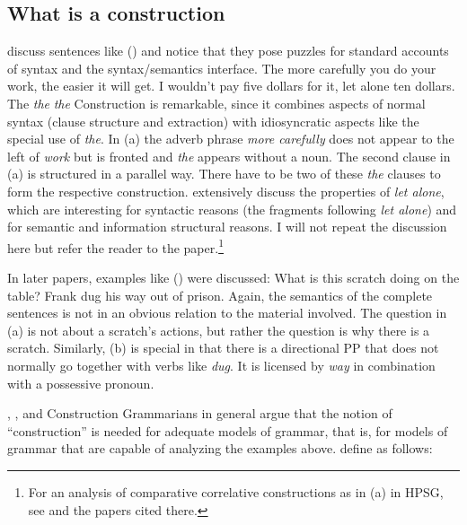 \documentclass[output=paper,biblatex,babelshorthands,newtxmath,draftmode,colorlinks,citecolor=brown]{langscibook}
\begin{document}
\subsection{What is a construction}
\label{sec-def-construction}

\citet*{FKoC88a} discuss sentences like () and notice that they pose puzzles for standard
accounts of syntax and the syntax/semantics interface.
\eal
\ex The more carefully you do your work, the easier it will get.
\ex I wouldn't pay five dollars for it, let alone ten dollars.
\zl
The \emph{the}  \emph{the}  Construction is remarkable, since it combines aspects of normal syntax
(clause structure and extraction) with idiosyncratic aspects like the special use of
\emph{the}. In (a) the adverb phrase \emph{more carefully} does not appear to the left of
\emph{work} but is fronted and \emph{the} appears without a noun. The second clause in (a) is structured
in a parallel way. There have to be two of these \emph{the} clauses to form the respective
construction. \citet*{FKoC88a} extensively discuss the properties of \emph{let alone}, which are
interesting for syntactic reasons (the fragments following \emph{let alone}) and for semantic and information
structural reasons. I will not repeat the discussion here but refer the reader to the
paper.\footnote{
  For an analysis of comparative correlative constructions as in (a) in HPSG, see
   and the papers
  cited there.
}

In later papers, examples like () were discussed:
\eal
\ex What is this scratch doing on the table? \hfill\citep[]{KF99a}
\ex Frank dug his way out of prison. \hfill\citep[]{Goldberg95a}
\zl
Again, the semantics of the complete sentences is not in an obvious relation to the material
involved. The question in (a) is not about a scratch's actions, but rather the question is why
there is a scratch. Similarly, (b) is special in that there is a directional PP that does not
normally go together with verbs like \emph{dug}. It is licensed by \emph{way} in combination with a
possessive pronoun.

\citet{FKoC88a}, \citet{Goldberg95a}, \citet{KF99a} and Construction Grammarians in general argue
that the notion of ``construction'' is needed for adequate models of grammar, that is, for models of
grammar that are capable of analyzing the examples above. \citet[]{FKoC88a} define
 as follows:
\end{document}

